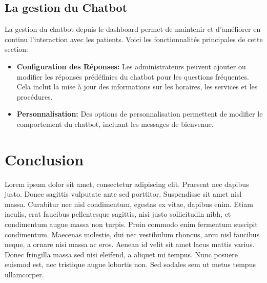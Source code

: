 \break

\subsection{La gestion du Chatbot}

\hspace{16pt} La gestion du chatbot depuis le dashboard permet de maintenir et d’améliorer en continu l’interaction avec les patients. Voici les fonctionnalités principales de cette section:

\begin{itemize}
  \item \textbf{Configuration des Réponses: }Les administrateurs peuvent ajouter ou modifier les réponses prédéfinies du chatbot pour les questions fréquentes. Cela inclut la mise à jour des informations sur les horaires, les services et les procédures.
  \item \textbf{Personnalisation: }Des options de personnalisation permettent de modifier le comportement du chatbot, incluant les messages de bienvenue.
\end{itemize}

\newpage

\section*{Conclusion}

Lorem ipsum dolor sit amet, consectetur adipiscing elit. Praesent nec dapibus justo. Donec sagittis vulputate ante sed porttitor. Suspendisse sit amet nisl massa. Curabitur nec nisl condimentum, egestas ex vitae, dapibus enim. Etiam iaculis, erat faucibus pellentesque sagittis, nisi justo sollicitudin nibh, et condimentum augue massa non turpis. Proin commodo enim fermentum suscipit condimentum. Maecenas molestie, dui nec vestibulum rhoncus, arcu nisl faucibus neque, a ornare nisi massa ac eros. Aenean id velit sit amet lacus mattis varius. Donec fringilla massa sed nisi eleifend, a aliquet mi tempus. Nunc posuere euismod est, nec tristique augue lobortis non. Sed sodales sem ut metus tempus ullamcorper.

\pagebreak

